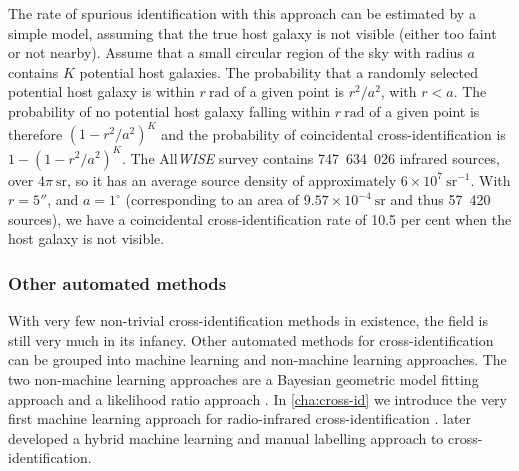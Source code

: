             The rate of spurious identification with this approach can be estimated by a simple model, assuming that the true host galaxy is not visible (either too faint or not nearby). Assume that a small circular region of the sky with radius $a$ contains $K$ potential host galaxies. The probability that a randomly selected potential host galaxy is within $r\ \mathrm{rad}$ of a given point is $r^2 / a^2$, with $r < a$. The probability of no potential host galaxy falling within $r\ \mathrm{rad}$ of a given point is therefore $(1 - r^2 / a^2)^K$ and the probability of coincidental cross-identification is $1 - (1 - r^2 / a^2)^K$. The All\emph{WISE} survey contains 747~634~026 infrared sources, over $4\pi\ \mathrm{sr}$, so it has an average source density of approximately $6 \times 10^7\ \mathrm{sr}^{-1}$. With $r = 5''$, and $a = 1^\circ$ (corresponding to an area of $9.57 \times 10^{-4}\ \mathrm{sr}$ and thus 57~420 sources), we have a coincidental cross-identification rate of 10.5 per cent when the host galaxy is not visible.


        \subsubsection{Other automated methods}
        \label{sec:xid-other}

            With very few non-trivial cross-identification methods in existence, the field is still very much in its infancy. Other automated methods for cross-identification can be grouped into machine learning and non-machine learning approaches. The two non-machine learning approaches are a Bayesian geometric model fitting approach \citep{fan15,fan_optimal_2020} and a likelihood ratio approach \citep{weston_astronomical_2020,weston18lrpy}. In \autoref{cha:cross-id} we introduce the very first machine learning approach for radio-infrared cross-identification \citep{alger18radio}. \citet{galvin_cataloguing_2020} later developed a hybrid machine learning and manual labelling approach to cross-identification.

